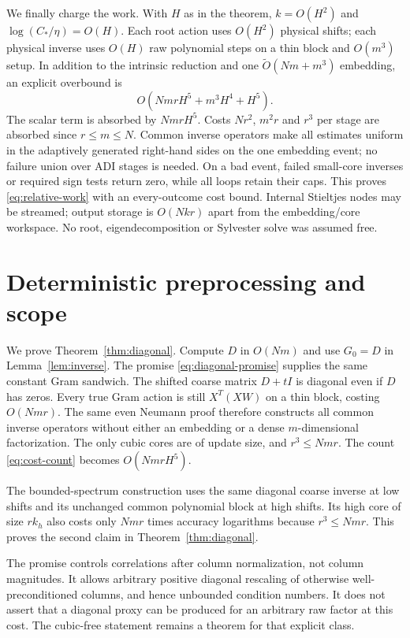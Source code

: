 \documentclass[11pt]{article}
\numberwithin{equation}{section}
\begin{document}
We finally charge the work. With $H$ as in the theorem,
$k=O(H^2)$ and $\log(C_*/\eta)=O(H)$. Each root action uses
$O(H^2)$ physical shifts; each physical inverse uses $O(H)$ raw
polynomial steps on a thin block and $O(m^3)$ setup. In addition to
the intrinsic reduction and one $\widetilde O(Nm+m^3)$ embedding,
an explicit overbound is
\begin{equation}\label{eq:cost-count}
 O(NmrH^5+m^3H^4+H^5).
\end{equation}
The scalar term is absorbed by $NmrH^5$. Costs $Nr^2$, $m^2r$ and
$r^3$ per stage are absorbed since $r\le m\le N$. Common inverse
operators make all estimates uniform in the adaptively generated
right-hand sides on the one embedding event; no failure union over
ADI stages is needed. On a bad event, failed small-core inverses or
required sign tests return zero, while all loops retain their caps.
This proves \eqref{eq:relative-work} with an every-outcome cost bound.
Internal Stieltjes nodes may be streamed; output storage is $O(Nkr)$
apart from the embedding/core workspace. No root, eigendecomposition
or Sylvester solve was assumed free.

\section{Deterministic preprocessing and scope}

We prove Theorem~\ref{thm:diagonal}. Compute $D$ in $O(Nm)$ and use
$G_0=D$ in Lemma~\ref{lem:inverse}. The promise
\eqref{eq:diagonal-promise} supplies the same constant Gram sandwich.
The shifted coarse matrix $D+tI$ is diagonal even if $D$ has zeros.
Every true Gram action is still $X^T(XW)$ on a thin block, costing
$O(Nmr)$. The same even Neumann proof therefore constructs all
common inverse operators without either an embedding or a dense
$m$-dimensional factorization. The only cubic cores are of update
size, and $r^3\le Nmr$. The count \eqref{eq:cost-count} becomes
$O(NmrH^5)$.

The bounded-spectrum construction uses the same diagonal coarse
inverse at low shifts and its unchanged common polynomial block at
high shifts. Its high core of size $rk_h$ also costs only $Nmr$
times accuracy logarithms because $r^3\le Nmr$. This proves the
second claim in Theorem~\ref{thm:diagonal}.

The promise controls correlations after column normalization, not
column magnitudes. It allows arbitrary positive diagonal rescaling
of otherwise well-preconditioned columns, and hence unbounded condition
numbers. It does not assert that a diagonal proxy can be produced for
an arbitrary raw factor at this cost. The cubic-free statement remains
a theorem for that explicit class.
\end{document}
